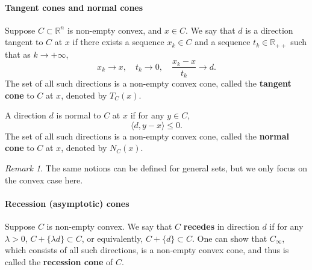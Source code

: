 \documentclass[openany]{book}
\theoremstyle{definition}
\theoremstyle{remark}
\newtheorem*{remark}{Remark}
\begin{document}
\paragraph{Tangent cones and normal cones}
Suppose $C\subset \mathbb{R}^n$ is non-empty convex, and $x\in C$. We say that $d$ is a direction tangent to $C$ at $x$ if there exists a sequence $x_k\in C$ and a sequence $t_k\in \mathbb{R}_{++}$ such that as $k\to+\infty$,
\begin{equation}
    x_k\to x,\quad t_k\to0,\quad \frac{x_k-x}{t_k}\to d.
\end{equation}
The set of all such directions is a non-empty convex cone, called the \textbf{tangent cone} to $C$ at $x$, denoted by $T_C(x)$.

A direction $d$ is normal to $C$ at $x$ if for any $y\in C$,
\begin{equation}
    \langle d,y-x\rangle\le0.
\end{equation}
The set of all such directions is a non-empty convex cone, called the \textbf{normal cone} to $C$ at $x$, denoted by $N_C(x)$.

\begin{remark}
    The same notions can be defined for general sets, but we only focus on the convex case here.
\end{remark}

\paragraph{Recession (asymptotic) cones}
Suppose $C$ is non-empty convex. We say that $C$ \textbf{recedes} in direction $d$ if for any $\lambda>0$, $C+\{\lambda d\}\subset C$, or equivalently, $C+\{d\}\subset C$. One can show that $C_{\infty}$, which consists of all such directions, is a non-empty convex cone, and thus is called the \textbf{recession cone} of $C$.
\end{document}
